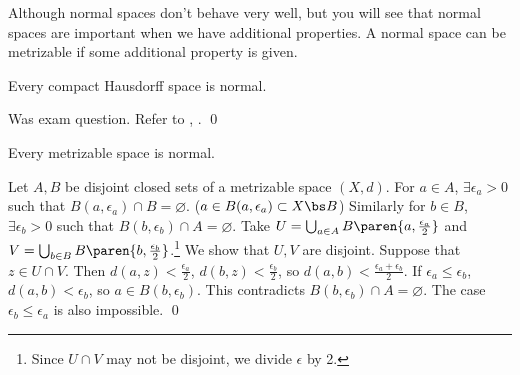 
Although normal spaces don't behave very well, but you will see that normal spaces are important when we have additional properties. A normal space can be metrizable if some additional property is given.

 Every compact Hausdorff space is normal.

\pf Was exam question. Refer to , . \qed

 Every metrizable space is normal.

\pf Let \(A, B\) be disjoint closed sets of a metrizable space \((X, d)\). For \(a \in A\), \(\exists \epsilon_a > 0\) such that \(B(a, \epsilon_a) \cap B = \varnothing\). (\(a \in B(a, \epsilon_a) \subset X \bs B\)) Similarly for \(b \in B\), \(\exists \epsilon_b > 0\) such that \(B(b, \epsilon_b) \cap A = \varnothing\). Take \(U = \bigcup_{a \in A} B\paren{a, \frac{\epsilon_a}{2}}\) and \(V = \bigcup_{b \in B} B\paren{b, \frac{\epsilon_b}{2}}\).\footnote{Since \(U \cap V\) may not be disjoint, we divide \(\epsilon\) by 2.} We show that \(U, V\) are disjoint. Suppose that \(z \in U \cap V\). Then \(d(a, z) < \frac{\epsilon_a}{2}\), \(d(b, z) < \frac{\epsilon_b}{2}\), so \(d(a, b) < \frac{\epsilon_a + \epsilon_b}{2}\). If \(\epsilon_a \leq \epsilon_b\), \(d(a, b) < \epsilon_b\), so \(a \in B(b, \epsilon_b)\). This contradicts \(B(b, \epsilon_b) \cap A = \varnothing\). The case \(\epsilon_b \leq \epsilon_a\) is also impossible. \qed

\pagebreak
